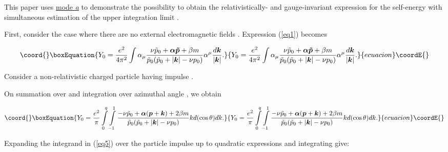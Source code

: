\documentclass[a4paper,draft,showpacs,preprint,prd,aps]{revtex4}
\begin{document}
This paper uses \underline {mode {\it a}} to
demonstrate the possibility to obtain the relativistically- and
gauge-invariant expression for the self-energy with simultaneous estimation
of the upper integration limit \coordHE{}.

First, consider the case where there are no external electromagnetic fields
\coordHE{}. Expression (\ref{eq1}) becomes

\begin{equation}\coord{}\boxEquation{
\label{eq4}
Y_0 = \frac{e^2}{4\pi^2}\int \alpha _\mu
\frac{\nu\tilde{p}_0 + {\bm \alpha} \bm{\tilde{p}} + \beta  m}
{\tilde{p}_0(\tilde {p}_0 + |{\bm k}| - \nu p_0 )}
\alpha^\mu \frac{d{\bm k}}{|{\bm k}|}.
}{
Y_0 = \frac{e^2}{4\pi^2}\int \alpha _\mu
\frac{\nu\tilde{p}_0 + {\bm \alpha} \bm{\tilde{p}} + \beta  m}
{\tilde{p}_0(\tilde {p}_0 + |{\bm k}| - \nu p_0 )}
\alpha^\mu \frac{d{\bm k}}{|{\bm k}|}.
}{ecuacion}\coordE{}\end{equation}

Consider a non-relativistic charged particle having impulse \coordHE{}.

On summation over \myHighlight{$\mu $}\coordHE{} and integration over azimuthal angle \myHighlight{$\varphi $}\coordHE{}, we
obtain

\begin{equation}\coord{}\boxEquation{
\label{eq5}
Y_0 = \frac{e^2}\pi\int\limits_0^q \int\limits_{-1}^1
\frac
{-\nu\tilde{p}_0 + {\bm \alpha}(\bm{p} + \bm{k}) + 2\beta m}
{\tilde{p}_0 (\tilde{p}_0 + |{\bm k}| - \nu p_0)}
k d(\cos\theta)dk.
}{
Y_0 = \frac{e^2}\pi\int\limits_0^q \int\limits_{-1}^1
\frac
{-\nu\tilde{p}_0 + {\bm \alpha}(\bm{p} + \bm{k}) + 2\beta m}
{\tilde{p}_0 (\tilde{p}_0 + |{\bm k}| - \nu p_0)}
k d(\cos\theta)dk.
}{ecuacion}\coordE{}\end{equation}

Expanding the integrand in (\ref{eq5}) over the particle impulse \coordHE{}
up to quadratic expressions \coordHE{} and integrating give:
\end{document}
